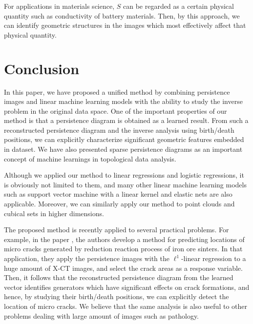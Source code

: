 \documentclass[smallextended]{svjour3}
\begin{document}
For applications in materials science, $S$ can be regarded as a certain physical quantity such as conductivity of battery materials. Then, by this approach, we can identify  geometric structures in the images which most effectively affect that physical quantity. 

\section{Conclusion}\label{sec:conclusion}
In this paper, we have proposed a unified method by combining persistence images and linear machine learning models with the ability to study the inverse problem in the original data space. One of the important properties of our method is that a persistence diagram is obtained as a learned result. From such a reconstructed persistence diagram and the inverse analysis using birth/death positions, we can explicitly characterize significant  geometric features embedded in dataset. We have also presented sparse persistence diagrams as an important concept of machine learnings in topological data analysis. 

Although we applied our method to linear regressions and logistic regressions, it is obviously not limited to them, and many other linear machine learning models such as support vector machine with a linear kernel and elastic nets are also applicable. Moreover, we can similarly apply our method to point clouds and cubical sets in higher dimensions. 




The proposed method is recently applied to several practical problems. For example, in the paper \citep{iron}, the authors develop  a method for predicting locations of micro cracks generated by reduction reaction process of iron ore sinters. In that application, they apply the persistence images with the $\ell^1$-linear regression to a huge amount of X-CT images, and select the crack areas as a response variable. Then, it follows that the reconstructed persistence diagram from the learned vector identifies  generators which have significant effects on crack formations, and hence, by studying their birth/death positions, we can explicitly detect the location of micro cracks. We believe that the same analysis is also useful to other problems dealing with large amount of images such as pathology. 
\end{document}
